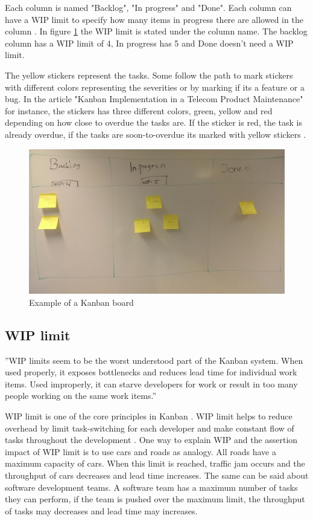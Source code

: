 \documentclass[UKenglish]{ifimaster}  %
\begin{document}
Each column is named "Backlog", "In progress" and "Done".  Each column can have a WIP limit to specify how many items in progress there are allowed in the column \parencite{Joyce}. In figure \ref{kanban_board} the WIP limit is stated under the column name. The backlog column has a WIP limit of 4, In progress has 5 and Done doesn't need a WIP limit. 

The yellow stickers represent the tasks. Some follow the path to mark stickers with different colors representing the severities or by marking if its a feature or a bug. In the article "Kanban Implementation in a Telecom Product Maintenance" for instance, the stickers has three different colors, green, yellow and red depending on how close to overdue the tasks are. If the sticker is red, the task is already overdue, if the tasks are soon-to-overdue its marked with yellow stickers \parencite{6068363}.
\begin{figure}[!htbp]
\centering
\includegraphics[width=\textwidth]{Picture/kanban_board.jpg}
\caption{Example of a Kanban board}
\label{kanban_board}
\end{figure}

\subsection{WIP limit}
\label{WIPsec}
''WIP limits seem to be the worst understood part of the Kanban system. When used properly, it exposes bottlenecks and reduces lead time for individual work items. Used improperly, it can starve developers for work or result in too many people working on the same work items.'' \parencite{Shinkle}

WIP limit is one of the core principles in Kanban \parencite{6068363}. WIP limit helps to reduce overhead by limit task-switching for each developer and make constant flow of tasks throughout the development \parencite{DavidAnderson}. One way to explain WIP and the assertion impact of WIP limit is to use cars and roads as analogy. All roads have a maximum capacity of cars. When this limit is reached, traffic jam occurs and the throughput of cars decreases and lead time increases. The same can be said about software development teams. A software team has a maximum number of tasks they can perform, if the team is pushed over the maximum limit, the throughput of tasks may decreases and lead time may increases.
\end{document}
